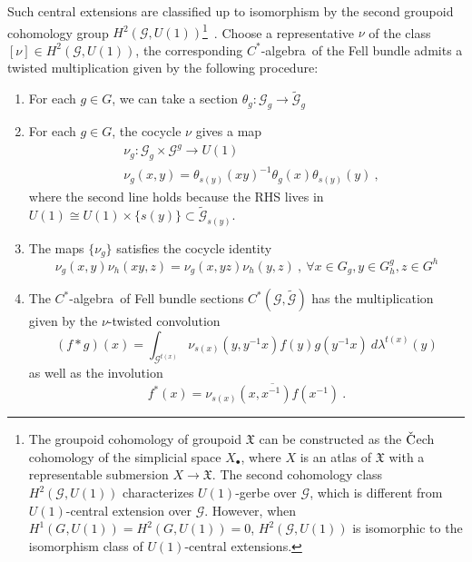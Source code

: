 \documentclass[a4paper,11pt]{article}
\newcommand{\be}{\begin{equation}}
\newcommand{\ee}{\end{equation}}
\newcommand{\ba}{\begin{aligned}}
\newcommand{\ea}{\end{aligned}}
\def\CG{\mathcal{G}}
\def\mfr{\mathfrak}
\def\calg{$C^*$-algebra\ }
\begin{document}
Such central extensions are classified up to isomorphism by the second groupoid cohomology group $H^2(\mathcal{G}, U(1))$\footnote{The groupoid cohomology of groupoid $\mfr{X}$ can be constructed as the $\check{\rm C}$ech cohomology of the simplicial space $X_\bullet$, where $X$ is an atlas of $\mfr{X}$ with a representable submersion $X\to \mfr{X}$. The second cohomology class $H^2(\CG,U(1))$ characterizes $U(1)$-gerbe over $\CG$, which is different from $U(1)$-central extension over $\CG$. However, when $H^1(G,U(1)) = H^2(G,U(1))= 0$, $H^2(\CG,U(1))$ is isomorphic to the isomorphism class of $U(1)$-central extensions.}~\cite{Behrend:2008}. Choose a representative $\nu$ of the class $[\nu]\in H^2(\CG,U(1))$, the corresponding \calg of the Fell bundle admits a twisted multiplication given by the following procedure:
\begin{enumerate}
    \item For each $g\in G$, we can take a section $\theta_g : \CG_g\to \widetilde{\CG}_g$
    \item For each $g\in G$, the cocycle $\nu$ gives a map 
    \be\ba
    &\nu_g: \CG_g\times \CG^g \to U(1) \\ 
    &\nu_g(x,y) = \theta_{s(y)}(xy)^{-1} \theta_g(x) \theta_{s(y)}(y) \ ,
    \ea\ee
    where the second line holds because the RHS lives in $U(1) \cong U(1) \times \{s(y) \}\subset \widetilde{\CG}_{s(y)}$.
    \item The maps $\{\nu_g\}$ satisfies the cocycle identity
    \be
    \nu_g\left(x, y\right) \nu_h\left(x y, z\right)=\nu_g\left(x, y z\right) \nu_h\left(y, z\right) \ , \ \forall x \in G_g, y \in G_h^g, z \in G^h
    \ee
    \item The \calg of Fell bundle sections $C^*(\CG,\widetilde{\CG})$ has the multiplication given by the $\nu$-twisted convolution
    \be
    (f*g)(x) = \int_{\CG^{t(x)}} \nu_{s(x)}(y,y^{-1}x) f(y) g(y^{-1}x) \  d\lambda^{t(x)}(y)
    \ee
    as well as the involution
    \be
    f^*(x) = \overline{\nu_{s(x)}(x,x^{-1}) f(x^{-1})} \ .
    \ee
\end{enumerate}
\end{document}
